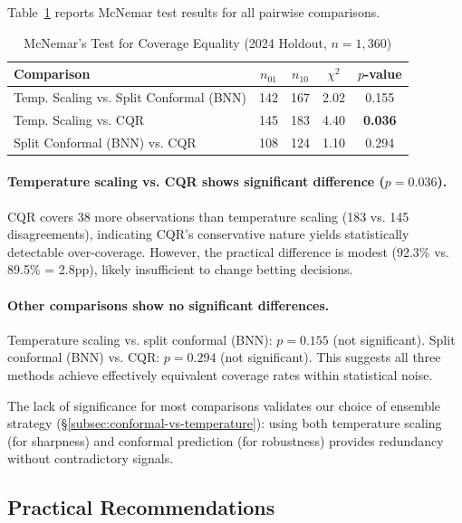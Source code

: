 Table~\ref{tab:conformal-mcnemar} reports McNemar test results for all pairwise comparisons.

\begin{table}[t]
\centering
\caption{McNemar's Test for Coverage Equality (2024 Holdout, $n=1{,}360$)}
\label{tab:conformal-mcnemar}
\begin{tabular}{@{}lcccc@{}}
\toprule
\textbf{Comparison} & \textbf{$n_{01}$} & \textbf{$n_{10}$} & \textbf{$\chi^2$} & \textbf{$p$-value} \\
\midrule
Temp. Scaling vs. Split Conformal (BNN) & 142 & 167 & 2.02 & 0.155 \\
Temp. Scaling vs. CQR & 145 & 183 & 4.40 & \textbf{0.036} \\
Split Conformal (BNN) vs. CQR & 108 & 124 & 1.10 & 0.294 \\
\bottomrule
\end{tabular}
\end{table}


\paragraph{Temperature scaling vs. CQR shows significant difference ($p=0.036$).}
CQR covers 38 more observations than temperature scaling (183 vs. 145 disagreements), indicating CQR's conservative nature yields statistically detectable over-coverage. However, the practical difference is modest (92.3\% vs. 89.5\% = 2.8pp), likely insufficient to change betting decisions.

\paragraph{Other comparisons show no significant differences.}
Temperature scaling vs. split conformal (BNN): $p=0.155$ (not significant). Split conformal (BNN) vs. CQR: $p=0.294$ (not significant). This suggests all three methods achieve effectively equivalent coverage rates within statistical noise.

The lack of significance for most comparisons validates our choice of ensemble strategy (\S\ref{subsec:conformal-vs-temperature}): using both temperature scaling (for sharpness) and conformal prediction (for robustness) provides redundancy without contradictory signals.

\subsection{Practical Recommendations}\label{subsec:conformal-recommendations}

